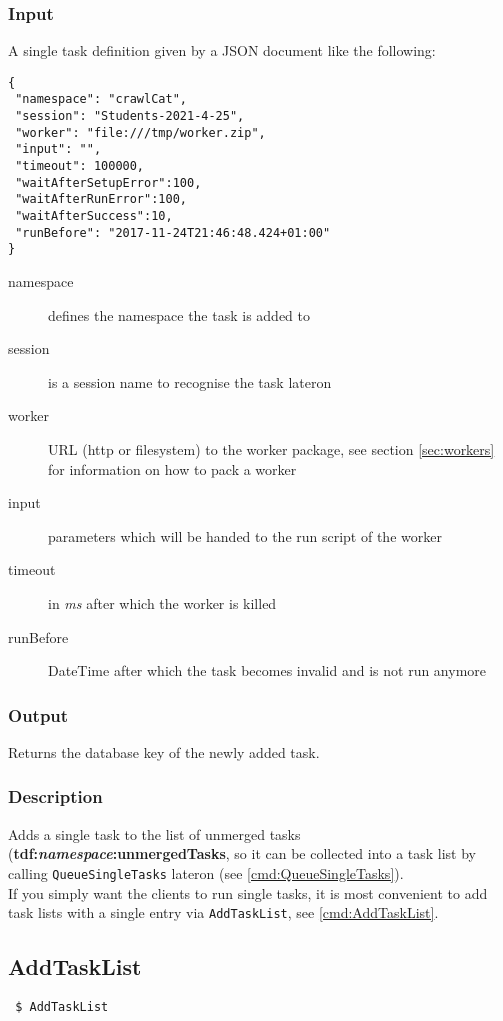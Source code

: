 \documentclass[a4paper,11pt]{article}
\begin{document}
\subsubsection{Input}
A single task definition given by a JSON document like the following:
\begin{verbatim}
{
 "namespace": "crawlCat",
 "session": "Students-2021-4-25",
 "worker": "file:///tmp/worker.zip",
 "input": "",
 "timeout": 100000,
 "waitAfterSetupError":100,
 "waitAfterRunError":100,
 "waitAfterSuccess":10,
 "runBefore": "2017-11-24T21:46:48.424+01:00"
}
\end{verbatim}

\begin{description}
\item[namespace] defines the namespace the task is added to
\item[session] is a session name to recognise the task lateron
\item[worker] URL (http or filesystem) to the worker package, see section \ref{sec:workers} for information on how to pack a worker
\item[input] parameters which will be handed to the run script of the worker
\item[timeout] in \textit{ms} after which the worker is killed
\item[runBefore] DateTime after which the task becomes invalid and is not run anymore
\end{description}

\subsubsection{Output}
Returns the database key of the newly added task.

\subsubsection{Description}
Adds a single task to the list of unmerged tasks (\textbf{tdf:\textit{namespace}:unmergedTasks}, so it can be collected into a task list by calling \texttt{QueueSingleTasks} lateron (see \ref{cmd:QueueSingleTasks}).\\
If you simply want the clients to run single tasks, it is most convenient to add task lists with a single entry via \texttt{AddTaskList}, see \ref{cmd:AddTaskList}.

\newpage


\subsection{AddTaskList\label{cmd:AddTaskList}}
\begin{verbatim}
 $ AddTaskList
\end{verbatim}
\end{document}
